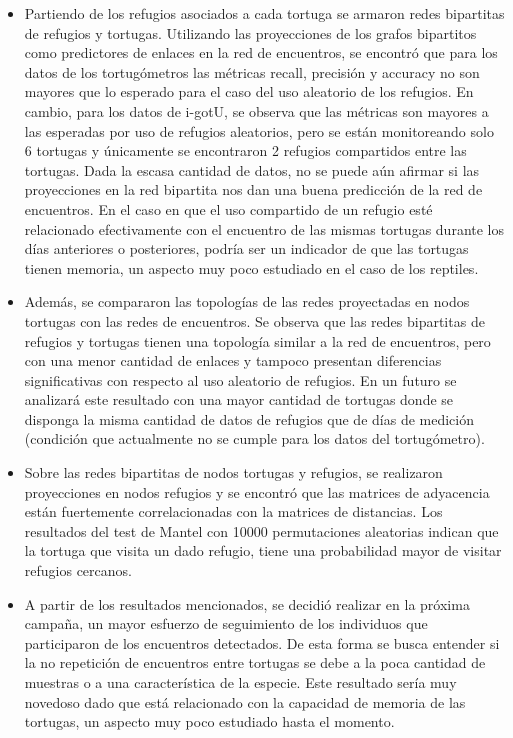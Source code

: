 \begin{itemize}
\item{Partiendo de los refugios asociados a cada tortuga se armaron redes 
bipartitas de refugios y tortugas. Utilizando las proyecciones de los grafos 
bipartitos como predictores de enlaces en la red de encuentros, se encontró 
que para los datos de los tortugómetros las métricas recall, precisión y 
accuracy no son mayores que lo esperado para el caso del uso aleatorio de los
refugios. En cambio, para los datos de i-gotU, se observa que las métricas 
son mayores a las 
esperadas por uso de refugios aleatorios, pero se están monitoreando solo 6 
tortugas y únicamente se encontraron 2 refugios compartidos entre las 
tortugas. Dada la escasa cantidad de datos, no se puede aún afirmar 
si las proyecciones en la red bipartita nos dan una buena predicción de la 
red de 
encuentros. En el caso en que el uso compartido de un refugio esté relacionado
efectivamente con el encuentro de las mismas tortugas durante los días 
anteriores o posteriores,
podría ser un indicador de que las tortugas tienen memoria, un aspecto muy poco
estudiado en el caso de los reptiles.}
 
\item{Además, se compararon las topologías de las redes proyectadas en nodos 
tortugas con las redes de encuentros. Se observa que las redes bipartitas de 
refugios y tortugas tienen una topología similar a la red de encuentros, pero 
con una menor cantidad de enlaces y tampoco presentan diferencias 
significativas con respecto al uso aleatorio de refugios. En un futuro se 
analizará este resultado con una mayor cantidad de tortugas donde se 
disponga la misma cantidad de datos de refugios que de días de medición 
(condición que actualmente no se cumple para los datos del tortugómetro).}
 
\item{Sobre las redes bipartitas de nodos tortugas y refugios, se realizaron 
proyecciones en nodos refugios y se encontró que las matrices de adyacencia 
están fuertemente correlacionadas con la matrices de distancias. Los resultados 
del test de Mantel con 10000 permutaciones aleatorias indican que la tortuga
que visita un dado refugio, tiene una probabilidad mayor de visitar refugios
cercanos.}

\item{A partir de los resultados mencionados, se decidió realizar 
en la próxima campaña, un mayor 
esfuerzo de seguimiento de los individuos que participaron de los 
encuentros  detectados. De esta forma se busca entender si la no 
repetición de encuentros entre tortugas se debe a la poca cantidad 
de muestras o a una característica de la especie. Este resultado 
sería muy novedoso dado que está relacionado con la capacidad de 
memoria de las tortugas, un aspecto muy poco estudiado hasta el 
momento.} 
\end{itemize} 


 
 
 

 
 
 
 

